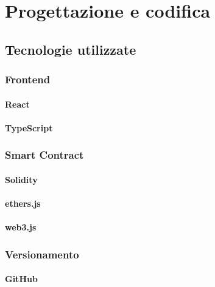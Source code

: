 \chapter{Progettazione e codifica}\label{cap:progettazione-codifica}


\section{Tecnologie utilizzate}\label{sec:tecnologie-strumenti}

\subsection{Frontend}
\subsubsection{React}

\subsubsection{TypeScript}

\subsection{Smart Contract}
\subsubsection{Solidity}

\subsubsection{ethers.js}

\subsubsection{web3.js}

\subsection{Versionamento}
\subsubsection{GitHub}

